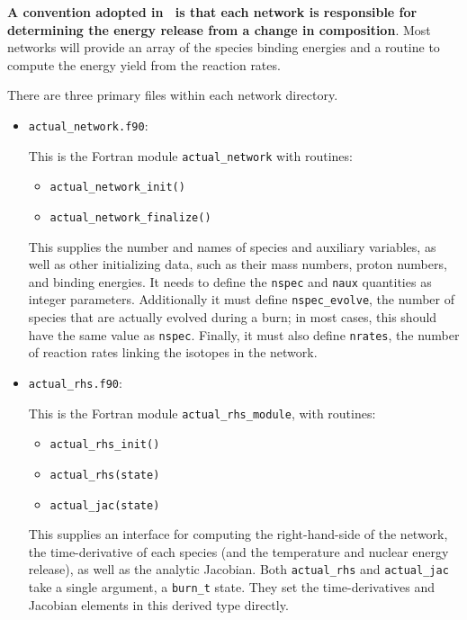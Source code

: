 {\bf A convention adopted in \microphysics\ is that each network
is responsible for determining the energy release from a change
in composition}.  Most networks will provide an array of the species
binding energies and a routine to compute the energy yield from
the reaction rates.

There are three primary files within each network directory.

\begin{itemize}

\item {\tt actual\_network.f90}:

  This is the Fortran module {\tt actual\_network} with routines:
  \begin{itemize}
  \item {\tt actual\_network\_init()}
  \item {\tt actual\_network\_finalize()}
  \end{itemize}

  This supplies the number and names of species and auxiliary
  variables, as well as other initializing data, such as their mass
  numbers, proton numbers, and binding energies. It needs to define
  the {\tt nspec} and {\tt naux} quantities as integer
  parameters. Additionally it must define {\tt nspec\_evolve}, the
  number of species that are actually evolved during a burn; in most
  cases, this should have the same value as {\tt nspec}.  Finally, it
  must also define {\tt nrates}, the number of reaction rates linking
  the isotopes in the network.

\item {\tt actual\_rhs.f90}:

  This is the Fortran module {\tt actual\_rhs\_module}, with routines:
  \begin{itemize}
  \item {\tt actual\_rhs\_init()}
  \item {\tt actual\_rhs(state)}
  \item {\tt actual\_jac(state)}
  \end{itemize}

  This supplies an interface for computing the right-hand-side of the
  network, the time-derivative of each species (and the temperature
  and nuclear energy release), as well as the analytic Jacobian.
  Both {\tt actual\_rhs} and {\tt actual\_jac} take a single argument,
  a {\tt burn\_t} state.  They set the time-derivatives and Jacobian
  elements in this derived type directly.


\end{itemize}
